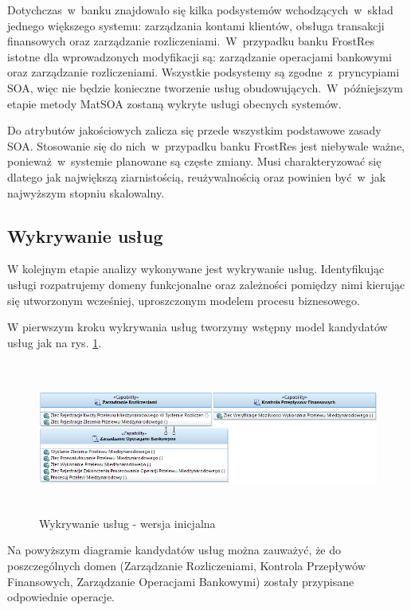 Dotychczas~w~banku znajdowało się kilka podsystemów wchodzących~w~skład jednego większego systemu: zarządzania kontami klientów, obsługa transakcji finansowych oraz zarządzanie rozliczeniami.~W~przypadku banku FrostRes istotne dla wprowadzonych modyfikacji są: zarządzanie operacjami bankowymi oraz zarządzanie rozliczeniami. Wszystkie podsystemy są zgodne~z~pryncypiami SOA, więc nie będzie konieczne tworzenie usług obudowujących.~W~późniejszym etapie metody MatSOA zostaną wykryte usługi obecnych systemów.

Do atrybutów jakościowych zalicza się przede wszystkim podstawowe zasady SOA. Stosowanie się do nich~w~przypadku banku FrostRes jest niebywale ważne, ponieważ~w~systemie planowane są częste zmiany. Musi charakteryzować się dlatego jak największą ziarnistością, reużywalnością oraz powinien być~w~jak najwyższym stopniu skalowalny. 

\subsection{Wykrywanie usług}
W kolejnym etapie analizy wykonywane jest wykrywanie usług. Identyfikując usługi rozpatrujemy domeny funkcjonalne oraz zależności pomiędzy nimi kierując się utworzonym wcześniej, uproszczonym modelem procesu biznesowego. 

W pierwszym kroku wykrywania usług tworzymy wstępny model kandydatów usług jak na rys. \ref{service_candidates_init}.

\begin{figure}[h!tbp]
\begin{centering}
\includegraphics[width=16cm, height=5cm]{img/service_candidates_init.png}
\caption[Wykrywanie usług - wersja inicjalna]{Wykrywanie usług - wersja inicjalna}\label{service_candidates_init}
\end{centering}
\end{figure}

Na powyższym diagramie kandydatów usług można zauważyć, że do poszczególnych domen (Zarządzanie Rozliczeniami, Kontrola Przepływów Finansowych, Zarządzanie Operacjami Bankowymi) zostały przypisane odpowiednie operacje. 

